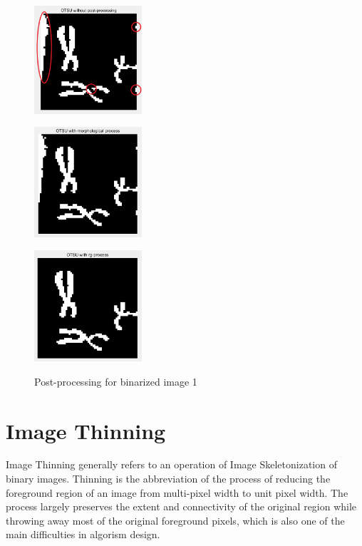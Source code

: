 \documentclass[hyperref]{article}
\theoremstyle{nonumberplain}
\begin{document}
	\begin{figure}[htbp]
		\centering
		\begin{minipage}[t]{0.3\textwidth}
			\centering
			\includegraphics[width=4cm]{without post-processing.png}
			\label{fig9a}
		\end{minipage}
		\begin{minipage}[t]{0.3\textwidth}
			\centering
			\includegraphics[width=4cm]{morphological process.png}
			\label{fig9b}
		\end{minipage}
		\begin{minipage}[t]{0.3\textwidth}
			\centering
			\includegraphics[width=4cm]{rg-process.png}
			\label{fig9c}
		\end{minipage}
		\caption{Post-processing for binarized image 1}
		\label{fig9}
	\end{figure}
	
	
	
	\section{Image Thinning}
	
	\hspace{1.0em}
	Image Thinning generally refers to an operation of Image Skeletonization of binary images. Thinning is the abbreviation of the process of reducing the foreground region of an image from multi-pixel width to unit pixel width. The process largely preserves the extent and connectivity of the original region while throwing away most of the original foreground pixels, which is also one of the main difficulties in algorism design. 
	
\end{document}
